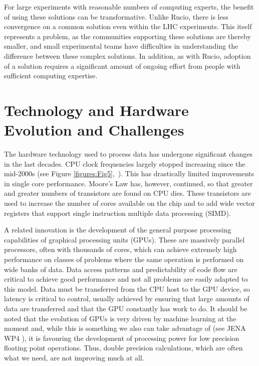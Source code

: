 For large experiments with reasonable numbers of computing experts, the benefit of using these solutions can be transformative. Unlike Rucio, there is less convergence on a common solution even within the LHC experiments. This itself represents a problem, as the communities supporting these solutions are thereby smaller, and small experimental teams have difficulties in understanding the difference between these complex solutions. In addition, as with Rucio, adoption of a solution requires a significant amount of ongoing effort from people with sufficient computing expertise.



\section{Technology and Hardware Evolution and Challenges}


The hardware technology used to process data has undergone significant changes in the last decades. CPU clock frequencies largely stopped increasing since the mid-2000s (see Figure \ref{figures:Fig5},~\cite{KRupp_Microprocessor_Data}). This has drastically limited improvements in single core performance. Moore's Law has, however, continued, so that greater and greater numbers of transistors are found on CPU dies. These transistors are used to increase the number of cores available on the chip and to add wide vector registers that support single instruction multiple data processing (SIMD).

A related innovation is the development of the general purpose processing capabilities of graphical processing units (GPUs). These are massively parallel processors, often with thousands of cores, which can achieve extremely high performance on classes of problems where the same operation is performed on wide banks of data. Data access patterns and predictability of code flow are critical to achieve good performance and not all problems are easily adapted to this model. Data must be transferred from the CPU host to the GPU device, so latency is critical to control, usually achieved by ensuring that large amounts of data are transferred and that the GPU constantly has work to do. It should be noted that the evolution of GPUs is very driven by machine learning at the moment and, while this is something we also can take advantage of (see JENA WP4 \cite{JENA_WG_Reports}), it is favouring the development of processing power for low precision floating point operations. Thus, double precision calculations, which are often what we need, are not improving much at all.

